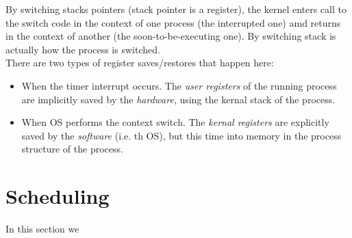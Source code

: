 By switching stacks pointers (stack pointer is a register),
the kernel enters call to the switch code in the 
context of one process (the interrupted one) amd returns in the context of
another (the soon-to-be-executing one). By switching stack is actually how the
process is switched.\\

There are two types of register saves/restores that happen here:

\begin{itemize}
    \item When the timer interrupt occurs. The \textit{user registers} of the
        running process are implicitly saved by the \textit{hardware}, using
        the kernal stack of the process.
    \item When OS performs the context switch. The \textit{kernal registers} 
        are explicitly saved by the \textit{software} (i.e. th OS), but this
        time into memory in the process structure of the process.
\end{itemize}

\section{Scheduling}

In this section we 
